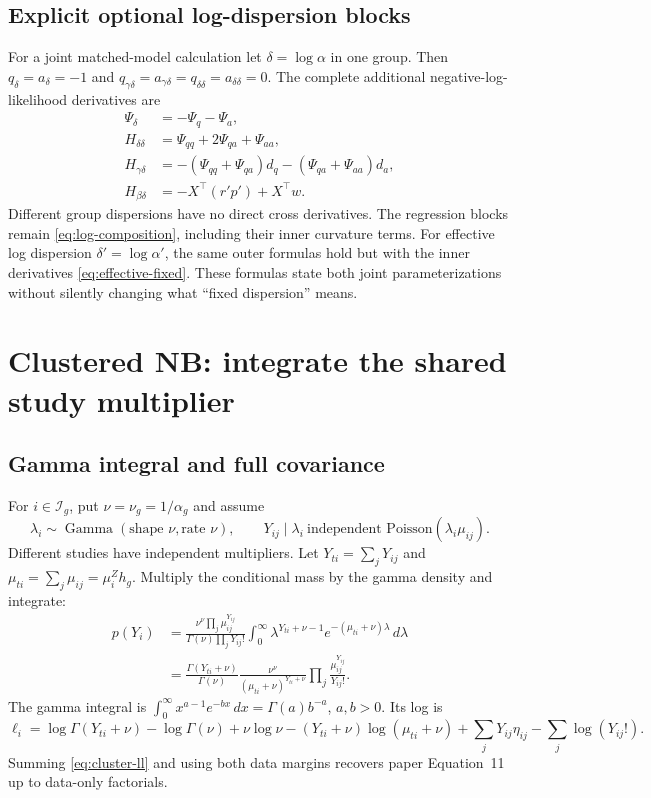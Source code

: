 \documentclass[11pt,a4paper]{article}
\numberwithin{equation}{section}
\begin{document}
\subsection{Explicit optional log-dispersion blocks}
For a joint matched-model calculation let $\delta=\log\alpha$ in one group.
Then $q_\delta=a_\delta=-1$ and
$q_{\gamma\delta}=a_{\gamma\delta}=q_{\delta\delta}=a_{\delta\delta}=0$.
The complete additional negative-log-likelihood derivatives are
\begin{align}
 \Psi_\delta&=-\Psi_q-\Psi_a,\\
 H_{\delta\delta}&=\Psi_{qq}+2\Psi_{qa}+\Psi_{aa},\\
 H_{\gamma\delta}
 &=-(\Psi_{qq}+\Psi_{qa})d_q-(\Psi_{qa}+\Psi_{aa})d_a,\\
 H_{\beta\delta}&=-X^\top({r'}p')+X^\top w .
 \label{eq:aggregate-dispersion}
\end{align}
Different group dispersions have no direct cross derivatives.
The regression blocks remain \eqref{eq:log-composition}, including
their inner curvature terms. For effective log dispersion
$\delta'=\log\alpha'$, the same outer formulas hold but with the inner
derivatives \eqref{eq:effective-fixed}.
These formulas state both joint parameterizations without silently
changing what ``fixed dispersion'' means.

\section{Clustered NB: integrate the shared study multiplier}\label{sec:cluster}

\subsection{Gamma integral and full covariance}
For $i\in\mathcal I_g$, put $\nu=\nu_g=1/\alpha_g$ and assume
\begin{equation}
 \lambda_i\sim\operatorname{Gamma}(\text{shape }\nu,\text{rate }\nu),
 \qquad Y_{ij}\mid\lambda_i\ \text{independent Poisson}(\lambda_i\mu_{ij}).
\end{equation}
Different studies have independent multipliers.
Let $Y_{ti}=\sum_jY_{ij}$ and ${\mu_{ti}}=\sum_j\mu_{ij}=\mu_i^Zh_g$.
Multiply the conditional mass by the gamma density and integrate:
\begin{align}
 p(Y_i)&=\frac{\nu^\nu\prod_j\mu_{ij}^{Y_{ij}}}
                   {\Gamma(\nu)\prod_jY_{ij}!}
       \int_0^\infty \lambda^{Y_{ti}+\nu-1}e^{-({\mu_{ti}}+\nu)\lambda}\,d\lambda\\
 &=\frac{\Gamma(Y_{ti}+\nu)}{\Gamma(\nu)}
       \frac{\nu^\nu}{({\mu_{ti}}+\nu)^{Y_{ti}+\nu}}
       \prod_j\frac{\mu_{ij}^{Y_{ij}}}{Y_{ij}!}. \label{eq:cluster-mass}
\end{align}
The gamma integral is
$\int_0^\infty x^{a-1}e^{-bx}\,dx=\Gamma(a)b^{-a}$, $a,b>0$.
Its log is
\begin{equation}
 \ell_i=\log\Gamma(Y_{ti}+\nu)-\log\Gamma(\nu)+\nu\log\nu
 -(Y_{ti}+\nu)\log({\mu_{ti}}+\nu)+\sum_jY_{ij}\eta_{ij}
 -\sum_j\log(Y_{ij}!). \label{eq:cluster-ll}
\end{equation}
Summing \eqref{eq:cluster-ll} and using both data margins recovers
paper Equation~11 up to data-only factorials.
\end{document}
